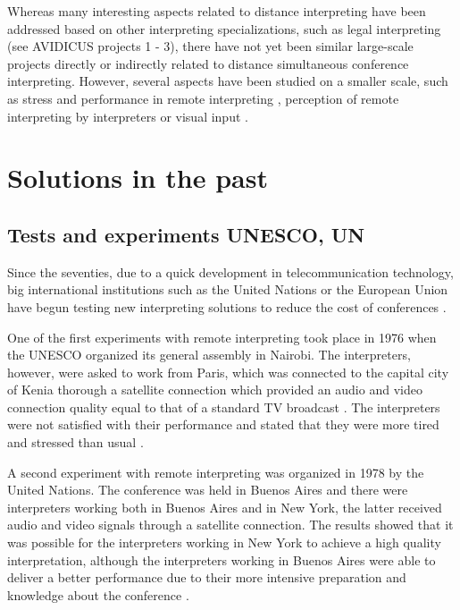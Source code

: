 \documentclass[output=paper]{langsci/langscibook}
\begin{document}
Whereas many interesting aspects related to distance interpreting have been addressed based on other interpreting specializations, such as legal interpreting (see AVIDICUS projects 1 - 3), there have not yet been similar large-scale projects directly or indirectly related to distance simultaneous conference interpreting. However, several aspects have been studied on a smaller scale, such as stress and performance in remote interpreting \citep{Moser-Mercer2003,Roziner2010}, perception of remote interpreting by interpreters \citep{Mouzourakis2006} or visual input \citep{Rennert2008,Luisetto2016}.

\section{Solutions in the past}
\subsection{Tests and experiments \textsc{UN}ESCO, \textsc{UN}}

Since the seventies, due to a quick development in telecommunication technology, big international institutions such as the United Nations or the European Union have begun testing new interpreting solutions to reduce the cost of conferences \citep[26]{UNESCO1987}.

One of the first experiments with remote interpreting took place in 1976 when the \textsc{UN}ESCO organized its general assembly in Nairobi. The interpreters, however, were asked to work from Paris, which was connected to the capital city of Kenia thorough a satellite connection which provided an audio and video connection quality equal to that of a standard TV broadcast \citep[30]{Mouzourakis1996}. The interpreters were not satisfied with their performance and stated that they were more tired and stressed than usual \citep[294]{Kurz2000}.

A second experiment with remote interpreting was organized in 1978 by the United Nations. The conference was held in Buenos Aires and there were interpreters working both in Buenos Aires and in New York, the latter received audio and video signals through a satellite connection. The results showed that it was possible for the interpreters working in New York to achieve a high quality interpretation, \citep[26]{UNESCO1987} although the interpreters working in Buenos Aires were able to deliver a better performance due to their more intensive preparation and knowledge about the conference \citep[82-90]{Chernov2004}. 
\end{document}
